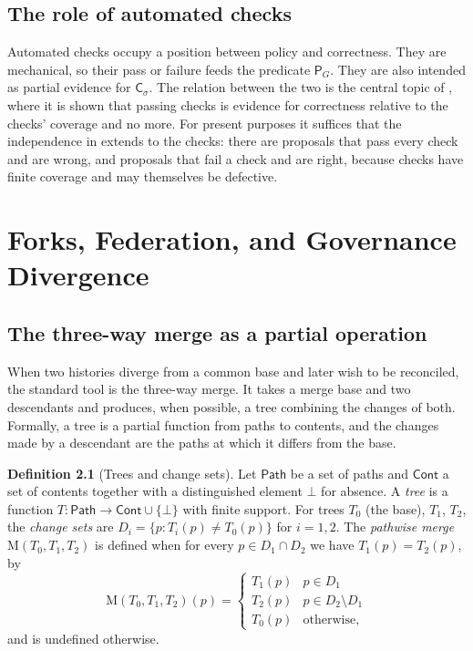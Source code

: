 \documentclass[11pt,twoside,openright]{book}
\theoremstyle{plain}
\theoremstyle{definition}
\newtheorem{definition}[theorem]{Definition}
\theoremstyle{remark}
\begin{document}
\section{The role of automated checks}

Automated checks occupy a position between policy and correctness. They are mechanical, so their pass or failure feeds the predicate $\mathsf{P}_G$. They are also intended as partial evidence for $\mathsf{C}_\sigma$. The relation between the two is the central topic of , where it is shown that passing checks is evidence for correctness relative to the checks' coverage and no more. For present purposes it suffices that the independence in  extends to the checks: there are proposals that pass every check and are wrong, and proposals that fail a check and are right, because checks have finite coverage and may themselves be defective.

\chapter{Forks, Federation, and Governance Divergence}\label{ch:federation}

\section{The three-way merge as a partial operation}

When two histories diverge from a common base and later wish to be reconciled, the standard tool is the three-way merge. It takes a merge base and two descendants and produces, when possible, a tree combining the changes of both. Formally, a tree is a partial function from paths to contents, and the changes made by a descendant are the paths at which it differs from the base.

\begin{definition}[Trees and change sets]\label{def:trees}
Let $\mathsf{Path}$ be a set of paths and $\mathsf{Cont}$ a set of contents together with a distinguished element $\bot$ for absence. A \emph{tree} is a function $T:\mathsf{Path}\to\mathsf{Cont}\cup\{\bot\}$ with finite support. For trees $T_0$ (the base), $T_1$, $T_2$, the \emph{change sets} are $D_i=\{p:T_i(p)\ne T_0(p)\}$ for $i=1,2$. The \emph{pathwise merge} $\mathrm{M}(T_0,T_1,T_2)$ is defined when for every $p\in D_1\cap D_2$ we have $T_1(p)=T_2(p)$, by
\[
\mathrm{M}(T_0,T_1,T_2)(p)=\begin{cases}T_1(p)&p\in D_1\\ T_2(p)&p\in D_2\setminus D_1\\ T_0(p)&\text{otherwise,}\end{cases}
\]
and is undefined otherwise.
\end{definition}
\end{document}
